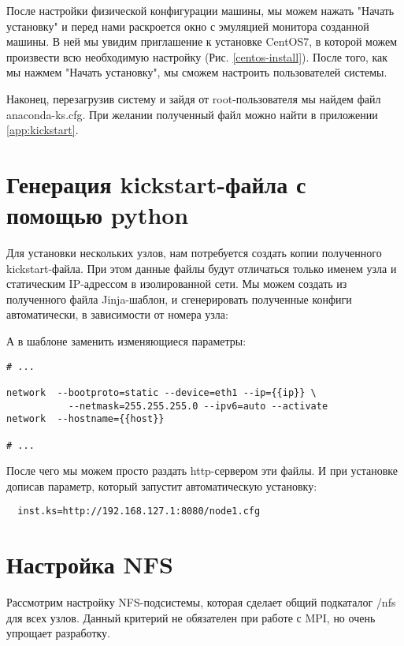 
После настройки физической конфигурации машины, мы можем нажать
"Начать установку" и перед нами раскроется окно с эмуляцией
монитора созданной машины. В ней мы увидим приглашение к установке
CentOS7, в которой можем произвести всю необходимую настройку
(Рис. \ref{centos-install}). После того, как мы
нажмем "Начать установку", мы сможем настроить пользователей
системы.

Наконец, перезагрузив систему и зайдя от \textmd{root}-пользователя
мы найдем файл \textmd{anaconda-ks.cfg}. При желании полученный
файл можно найти в приложении \ref{app:kickstart}.

\clearpage

\section{Генерация kickstart-файла с помощью python}
Для установки нескольких узлов, нам потребуется создать
копии полученного \textmd{kickstart}-файла. При этом
данные файлы будут отличаться только именем узла и
статическим IP-адрессом в изолированной сети. Мы можем
создать из полученного файла Jinja-шаблон\cite{jinja2}, и
сгенерировать полученные конфиги автоматически, в зависимости
от номера узла:



А в шаблоне заменить изменяющиеся параметры:

\begin{verbatim}
# ...

network  --bootproto=static --device=eth1 --ip={{ip}} \
           --netmask=255.255.255.0 --ipv6=auto --activate
network  --hostname={{host}}

# ...
\end{verbatim}

После чего мы можем просто раздать http-сервером эти файлы.
И при установке дописав параметр, который запустит
автоматическую установку:
\begin{verbatim}
  inst.ks=http://192.168.127.1:8080/node1.cfg
\end{verbatim}

\section{Настройка NFS}

Рассмотрим настройку NFS-подсистемы, которая сделает общий
подкаталог \textmd{/nfs} для всех узлов. Данный критерий не
обязателен при работе с MPI, но очень упрощает разработку.

